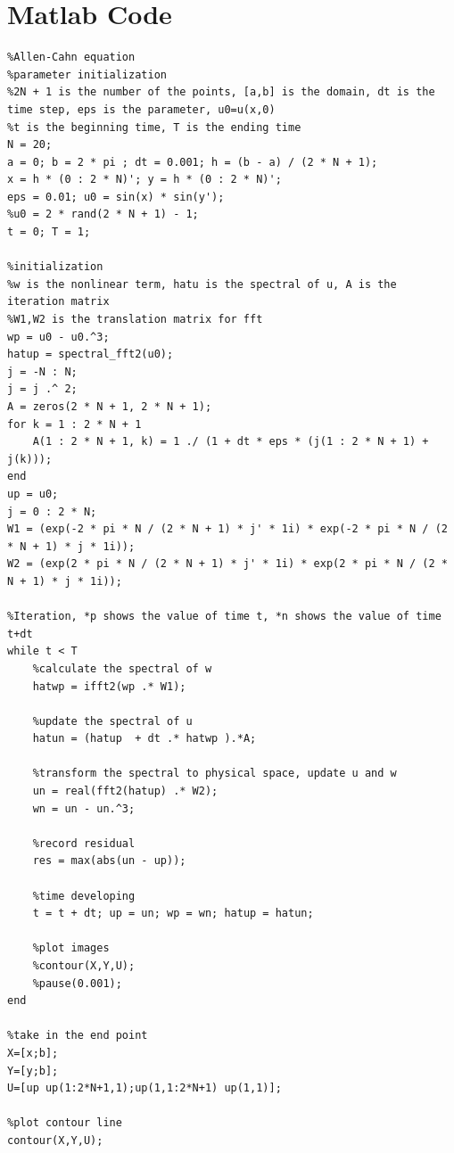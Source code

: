 \documentclass[a4paper]{article}
\begin{document}
\section{Matlab Code}
\begin{lstlisting}
%Allen-Cahn equation
%parameter initialization
%2N + 1 is the number of the points, [a,b] is the domain, dt is the time step, eps is the parameter, u0=u(x,0)
%t is the beginning time, T is the ending time
N = 20;
a = 0; b = 2 * pi ; dt = 0.001; h = (b - a) / (2 * N + 1);
x = h * (0 : 2 * N)'; y = h * (0 : 2 * N)';
eps = 0.01; u0 = sin(x) * sin(y');
%u0 = 2 * rand(2 * N + 1) - 1;
t = 0; T = 1;

%initialization
%w is the nonlinear term, hatu is the spectral of u, A is the iteration matrix
%W1,W2 is the translation matrix for fft
wp = u0 - u0.^3;
hatup = spectral_fft2(u0);
j = -N : N;
j = j .^ 2;
A = zeros(2 * N + 1, 2 * N + 1);
for k = 1 : 2 * N + 1
    A(1 : 2 * N + 1, k) = 1 ./ (1 + dt * eps * (j(1 : 2 * N + 1) + j(k)));
end
up = u0;
j = 0 : 2 * N;
W1 = (exp(-2 * pi * N / (2 * N + 1) * j' * 1i) * exp(-2 * pi * N / (2 * N + 1) * j * 1i));
W2 = (exp(2 * pi * N / (2 * N + 1) * j' * 1i) * exp(2 * pi * N / (2 * N + 1) * j * 1i));

%Iteration, *p shows the value of time t, *n shows the value of time t+dt
while t < T 
    %calculate the spectral of w
    hatwp = ifft2(wp .* W1);
    
    %update the spectral of u
    hatun = (hatup  + dt .* hatwp ).*A;
    
    %transform the spectral to physical space, update u and w
    un = real(fft2(hatup) .* W2);
    wn = un - un.^3;
    
    %record residual
    res = max(abs(un - up));
    
    %time developing
    t = t + dt; up = un; wp = wn; hatup = hatun;
    
    %plot images
    %contour(X,Y,U);
    %pause(0.001);
end

%take in the end point
X=[x;b];
Y=[y;b];
U=[up up(1:2*N+1,1);up(1,1:2*N+1) up(1,1)];

%plot contour line
contour(X,Y,U);
        
\end{lstlisting}
\end{document}

